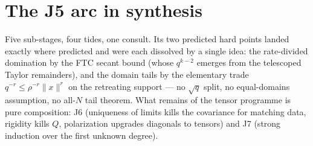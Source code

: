 \documentclass[11pt]{article}
\begin{document}
\section{The J5 arc in synthesis}

Five sub-stages, four tides, one consult. Its two predicted hard
points landed exactly where predicted and were each dissolved by a
single idea: the rate-divided domination by the FTC secant bound
(whose $q^{k-2}$ emerges from the telescoped Taylor remainders), and
the domain tails by the elementary trade
$q^{-r} \le \rho^{-r}\|x\|^r$ on the retreating support --- no
$\sqrt q$ split, no equal-domains assumption, no all-$N$ tail
theorem. What remains of the tensor programme is pure composition:
J6 (uniqueness of limits kills the covariance for matching data,
rigidity kills $Q$, polarization upgrades diagonals to tensors) and
J7 (strong induction over the first unknown degree).
\end{document}
